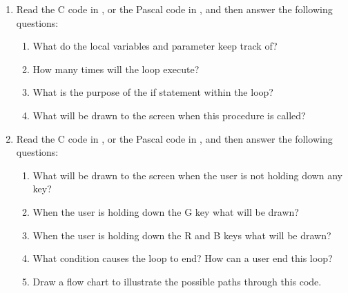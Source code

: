 \begin{enumerate}
  \item Read the C code in , or the Pascal code in , and then answer the following questions:
  \begin{enumerate}
    \item What do the local variables and parameter keep track of?
    \item How many times will the loop execute?
    \item What is the purpose of the if statement within the loop?
    \item What will be drawn to the screen when this procedure is called?
  \end{enumerate}
  \begin{figure}[h]
  \end{figure}
  \begin{figure}[h]
  \end{figure}
  \clearpage
  
  \item Read the C code in , or the Pascal code in , and then answer the following questions:
  \begin{enumerate}
    \item What will be drawn to the screen when the user is not holding down any key?
    \item When the user is holding down the G key what will be drawn?
    \item When the user is holding down the R and B keys what will be drawn?
    \item What condition causes the loop to end? How can a user end this loop?
    \item Draw a flow chart to illustrate the possible paths through this code.
  \end{enumerate}
  \begin{figure}[h]
  \end{figure}
  \begin{figure}[h]
  \end{figure}
  \clearpage
  

\end{enumerate}
